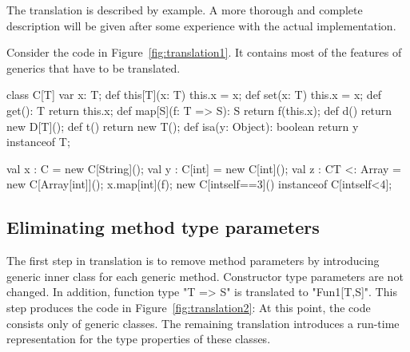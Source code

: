 \documentclass[nocopyrightspace,9pt]{sigplanconf}
\begin{document}
The translation is described by example.  A more thorough and complete
description will be given after some experience with the actual
implementation.

Consider the code in Figure~\ref{fig:translation1}.  It contains most of the 
features of generics that have to be translated.
\begin{figure*}[tp]
\begin{xten}
class C[T] {
    var x: T;
    def this[T](x: T) { this.x = x; }
    def set(x: T) { this.x = x; }
    def get(): T { return this.x; }
    def map[S](f: T => S): S { return f(this.x); }
    def d() { return new D[T](); }
    def t() { return new T(); }
    def isa(y: Object): boolean { return y instanceof T; }
}

val x : C = new C[String]();
val y : C[int] = new C[int]();
val z : C{T <: Array} = new C[Array[int]]();
x.map[int](f);
new C[int{self==3}]() instanceof C[int{self<4}];
\end{xten}
\caption{Code to translate}
\label{fig:translation1}
\end{figure*}

\subsection{Eliminating method type parameters}

\begin{figure*}[tp]
\caption{After removing method parameters}
\label{fig:translation2}
\end{figure*}

The first step in translation is to remove method parameters by
introducing generic inner class for each generic method.
Constructor type parameters are not changed.
In addition, function type \xcd"T => S" is translated to \xcd"Fun1[T,S]".
This step produces the code in Figure~\ref{fig:translation2}:
At this point, the code consists only of generic classes.
The remaining translation introduces a run-time representation
for the type properties of these classes.
\end{document}
